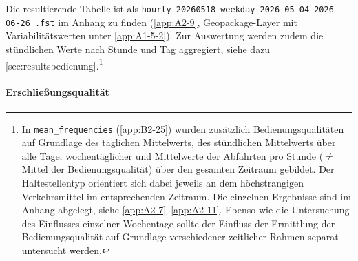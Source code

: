 \documentclass[11pt,pdftex,a4paper]{scrartcl}
\begin{document}
	Die resultierende Tabelle ist als \texttt{hourly\_20260518\_weekday\_2026-05-04\_2026-06-26\_.fst} im Anhang zu finden (\ref{app:A2-9}, Geopackage-Layer mit Variabilitätswerten unter \ref{app:A1-5-2}).	Zur Auswertung werden zudem die stündlichen Werte nach Stunde und Tag aggregiert, siehe dazu \ref{sec:resultsbedienung}.\footnote{In \texttt{mean\_frequencies} (\ref{app:B2-25}) wurden zusätzlich Bedienungsqualitäten auf Grundlage des täglichen Mittelwerts, des stündlichen Mittelwerts über alle Tage, wochentäglicher und Mittelwerte der Abfahrten pro Stunde ($\neq$ Mittel der Bedienungsqualität) über den gesamten Zeitraum gebildet. Der Haltestellentyp orientiert sich dabei jeweils an dem höchstrangigen Verkehrsmittel im entsprechenden Zeitraum. Die einzelnen Ergebnisse sind im Anhang abgelegt, siehe \ref{app:A2-7}--\ref{app:A2-11}. Ebenso wie die Untersuchung des Einflusses einzelner Wochentage sollte der Einfluss der Ermittlung der Bedienungsqualität auf Grundlage verschiedener zeitlicher Rahmen separat untersucht werden.}
	\paragraph{Erschließungsqualität}
	\begin{table}[htbp]
		\centering
		\fontsize{9}{10}\selectfont
		\makebox[\textwidth][c]{%
			
		}
		\caption{Erschließungsqualitätsklassen übernommen nach \textcite[27]{bmdvIndikatorenLeichtGemacht2025}}
		\label{tab:erschließungsqualität}
	\end{table}
\end{document}
